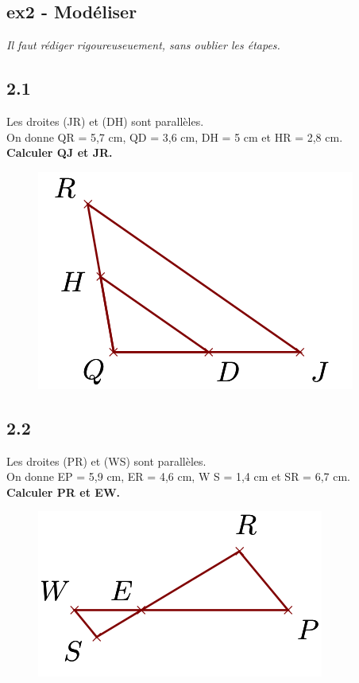 \documentclass[12pt]{article}
\begin{document}
\subsection*{ex2 - Modéliser}
\textit{Il faut rédiger rigoureuseuement, sans oublier les étapes.}

\begin{multicols}{2}

  \subsection*{2.1}

  \begin{multicols}{2}

    Les droites (JR) et (DH) sont parallèles.\\
    On donne QR = 5,7 cm, QD = 3,6 cm, DH = 5 cm et HR = 2,8 cm.\\
    \textbf{Calculer QJ et JR.}
    \begin{figure}[H]
      \centering
      \includegraphics[width=.5\linewidth]{4x6-thales/sources/th1.png}
    \end{figure}

  \end{multicols}

  \subsection*{2.2}
  \begin{multicols}{2}
    Les droites (PR) et (WS) sont parallèles.\\
    On donne EP = 5,9 cm, ER = 4,6 cm, W S = 1,4 cm et SR = 6,7 cm.\\
    \textbf{Calculer PR et EW.}
    \begin{figure}[H]
      \centering
      \includegraphics[width=.5\linewidth]{4x6-thales/sources/th2.png}
    \end{figure}
  \end{multicols}



\end{multicols}
\end{document}

